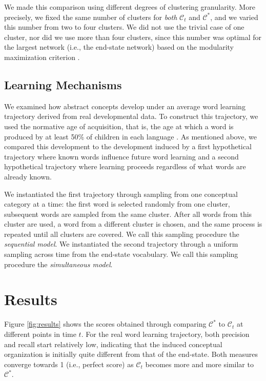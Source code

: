 \documentclass[11pt]{article}
\begin{document}
We made this comparison using different degrees of clustering
granularity. More precisely, we fixed the same number of clusters for
\emph{both} \(\mathcal{C}_t\) and \(\mathcal{C}^*\), and we varied this
number from two to four clusters. We did not use the trivial case of one
cluster, nor did we use more than four clusters, since this number was
optimal for the largest network (i.e., the end-state network) based on
the modularity maximization criterion \cite{newman2006}.

\subsection{Learning Mechanisms}\label{learning-mechanisms}

We examined how abstract concepts develop under an average word learning
trajectory derived from real developmental data. To construct this
trajectory, we used the normative age of acquisition, that is, the age
at which a word is produced by at least 50\% of children in each
language \cite{goodman2008}. As mentioned above, we compared this
development to the development induced by a first hypothetical
trajectory where known words influence future word learning and a second
hypothetical trajectory where learning proceeds regardless of what words
are already known.

We instantiated the first trajectory through sampling from one
conceptual category at a time: the first word is selected randomly from
one cluster, subsequent words are sampled from the same cluster. After
all words from this cluster are used, a word from a different cluster is
chosen, and the same process is repeated until all clusters are covered.
We call this sampling procedure the \emph{sequential model}. We
instantiated the second trajectory through a uniform sampling across
time from the end-state vocabulary. We call this sampling procedure the
\emph{simultaneous model}.

\section{Results}\label{results}

Figure \ref{fig:results} shows the scores obtained through comparing
\(\mathcal{C}^*\) to \(\mathcal{C}_t\) at different points in time
\(t\). For the real word learning trajectory, both precision and recall
start relatively low, indicating that the induced conceptual
organization is initially quite different from that of the end-state.
Both measures converge towards 1 (i.e., perfect score) as
\(\mathcal{C}_t\) becomes more and more similar to \(\mathcal{C}^*\).
\end{document}
